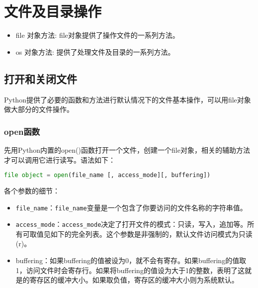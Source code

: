 \section{文件及目录操作}
\begin{itemize}
\item file 对象方法: file对象提供了操作文件的一系列方法。
\item os 对象方法: 提供了处理文件及目录的一系列方法。
\end{itemize}



\subsection{打开和关闭文件}
Python提供了必要的函数和方法进行默认情况下的文件基本操作，可以用file对象做大部分的文件操作。


\subsubsection{open函数}
先用Python内置的open()函数打开一个文件，创建一个file对象，相关的辅助方法才可以调用它进行读写。语法如下：
 \begin{lstlisting}[language=Python]
file object = open(file_name [, access_mode][, buffering])
  \end{lstlisting}
各个参数的细节：
\begin{itemize}
\item \verb|file_name|：\verb|file_name|变量是一个包含了你要访问的文件名称的字符串值。

\item \verb|access_mode|：\verb|access_mode|决定了打开文件的模式：只读，写入，追加等。所有可取值见如下的完全列表。这个参数是非强制的，默认文件访问模式为只读(r)。

\item buffering：如果buffering的值被设为0，就不会有寄存。如果buffering的值取1，访问文件时会寄存行。如果将buffering的值设为大于1的整数，表明了这就是的寄存区的缓冲大小。如果取负值，寄存区的缓冲大小则为系统默认。
\end{itemize}

